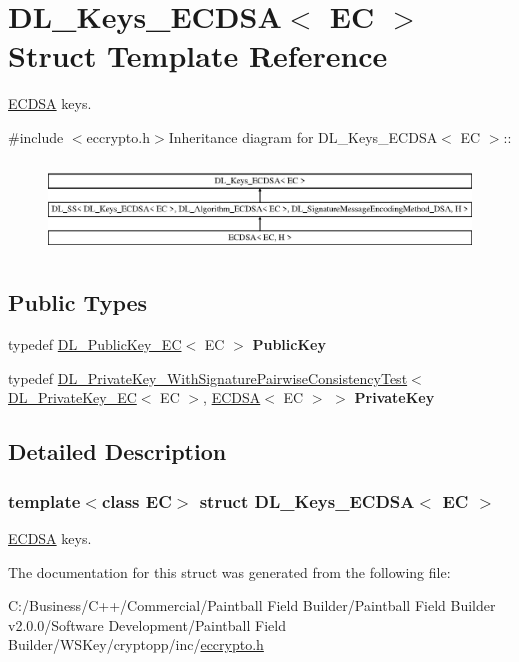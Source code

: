 \hypertarget{struct_d_l___keys___e_c_d_s_a}{
\section{DL\_\-Keys\_\-ECDSA$<$ EC $>$ Struct Template Reference}
\label{struct_d_l___keys___e_c_d_s_a}
}


\hyperlink{struct_e_c_d_s_a}{ECDSA} keys.  


{\ttfamily \#include $<$eccrypto.h$>$}Inheritance diagram for DL\_\-Keys\_\-ECDSA$<$ EC $>$::\begin{figure}[H]
\begin{center}
\leavevmode
\includegraphics[height=2.45614cm]{struct_d_l___keys___e_c_d_s_a}
\end{center}
\end{figure}
\subsection*{Public Types}
\begin{DoxyCompactItemize}
\item 
\hypertarget{struct_d_l___keys___e_c_d_s_a_a252dccfdc6cf04a6cf9bb1af052d4b53}{
typedef \hyperlink{class_d_l___public_key___e_c}{DL\_\-PublicKey\_\-EC}$<$ EC $>$ {\bfseries PublicKey}}
\label{struct_d_l___keys___e_c_d_s_a_a252dccfdc6cf04a6cf9bb1af052d4b53}

\item 
\hypertarget{struct_d_l___keys___e_c_d_s_a_a4699a43403af1f2899c1e040a7cbd9f0}{
typedef \hyperlink{class_d_l___private_key___with_signature_pairwise_consistency_test}{DL\_\-PrivateKey\_\-WithSignaturePairwiseConsistencyTest}$<$ \hyperlink{class_d_l___private_key___e_c}{DL\_\-PrivateKey\_\-EC}$<$ EC $>$, \hyperlink{struct_e_c_d_s_a}{ECDSA}$<$ EC $>$ $>$ {\bfseries PrivateKey}}
\label{struct_d_l___keys___e_c_d_s_a_a4699a43403af1f2899c1e040a7cbd9f0}

\end{DoxyCompactItemize}


\subsection{Detailed Description}
\subsubsection*{template$<$class EC$>$ struct DL\_\-Keys\_\-ECDSA$<$ EC $>$}

\hyperlink{struct_e_c_d_s_a}{ECDSA} keys. 

The documentation for this struct was generated from the following file:\begin{DoxyCompactItemize}
\item 
C:/Business/C++/Commercial/Paintball Field Builder/Paintball Field Builder v2.0.0/Software Development/Paintball Field Builder/WSKey/cryptopp/inc/\hyperlink{eccrypto_8h}{eccrypto.h}\end{DoxyCompactItemize}
